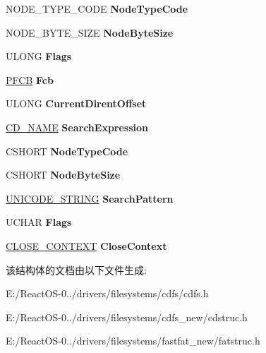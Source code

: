 \begin{DoxyCompactItemize}
N\+O\+D\+E\+\_\+\+T\+Y\+P\+E\+\_\+\+C\+O\+DE {\bfseries Node\+Type\+Code}
\item 
\mbox{\label{struct___c_c_b_ae33716605c6c95f4e3f1047749e65ed6}} 
N\+O\+D\+E\+\_\+\+B\+Y\+T\+E\+\_\+\+S\+I\+ZE {\bfseries Node\+Byte\+Size}
\item 
\mbox{\label{struct___c_c_b_ac7be901a7c3a55f0405c740403e00397}} 
U\+L\+O\+NG {\bfseries Flags}
\item 
\mbox{\label{struct___c_c_b_a38a12745fc889ca63f19f28ef849d61d}} 
\hyperlink{struct___f_c_b}{P\+F\+CB} {\bfseries Fcb}
\item 
\mbox{\label{struct___c_c_b_a1f13dfe3cd71be8c249cf40b5d9fe30c}} 
U\+L\+O\+NG {\bfseries Current\+Dirent\+Offset}
\item 
\mbox{\label{struct___c_c_b_a30cc459b41652554c1097f86acc63b07}} 
\hyperlink{struct___c_d___n_a_m_e}{C\+D\+\_\+\+N\+A\+ME} {\bfseries Search\+Expression}
\item 
\mbox{\label{struct___c_c_b_affc3b1241eb94134d4c71ceaf8f2f949}} 
C\+S\+H\+O\+RT {\bfseries Node\+Type\+Code}
\item 
\mbox{\label{struct___c_c_b_a2a67519e48b71139e2393634b909bab1}} 
C\+S\+H\+O\+RT {\bfseries Node\+Byte\+Size}
\item 
\mbox{\label{struct___c_c_b_ab9e0b8bb0e7a441aafca3912b4ea800c}} 
\hyperlink{struct___u_n_i_c_o_d_e___s_t_r_i_n_g}{U\+N\+I\+C\+O\+D\+E\+\_\+\+S\+T\+R\+I\+NG} {\bfseries Search\+Pattern}
\item 
\mbox{\label{struct___c_c_b_a225f2f4f44522c82bd75c573cee1a8e1}} 
U\+C\+H\+AR {\bfseries Flags}
\item 
\mbox{\label{struct___c_c_b_abdd5a9067e591cbe2d2751256bef1b56}} 
\hyperlink{struct___c_l_o_s_e___c_o_n_t_e_x_t}{C\+L\+O\+S\+E\+\_\+\+C\+O\+N\+T\+E\+XT} {\bfseries Close\+Context}
\end{DoxyCompactItemize}


该结构体的文档由以下文件生成\+:\begin{DoxyCompactItemize}
\item 
E\+:/\+React\+O\+S-\/0../drivers/filesystems/cdfs/cdfs.\+h\item 
E\+:/\+React\+O\+S-\/0../drivers/filesystems/cdfs\+\_\+new/cdstruc.\+h\item 
E\+:/\+React\+O\+S-\/0../drivers/filesystems/fastfat\+\_\+new/fatstruc.\+h\end{DoxyCompactItemize}
